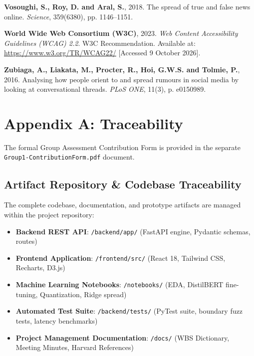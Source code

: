 \documentclass[11pt, a4paper]{article}
\newcommand{\code}[1]{\texttt{\small #1}}
\begin{document}
\begin{enumerate}[label={[\arabic*]}, leftmargin=2.5em]
  \item \label{ref:vosoughi} \textbf{Vosoughi, S., Roy, D. and Aral, S.}, 2018. The spread of true and false news online. \emph{Science}, 359(6380), pp. 1146--1151.

  \item \label{ref:w3c} \textbf{World Wide Web Consortium (W3C)}, 2023. \emph{Web Content Accessibility Guidelines (WCAG) 2.2}. W3C Recommendation. Available at: \url{https://www.w3.org/TR/WCAG22/} [Accessed 9 October 2026].

  \item \label{ref:zubiaga} \textbf{Zubiaga, A., Liakata, M., Procter, R., Hoi, G.W.S. and Tolmie, P.}, 2016. Analysing how people orient to and spread rumours in social media by looking at conversational threads. \emph{PLoS ONE}, 11(3), p. e0150989.
\end{enumerate}

\appendix
\section{Appendix A: Traceability}
\label{sec:appendix}

The formal Group Assessment Contribution Form is provided in the separate \texttt{Group1-ContributionForm.pdf} document.

\subsection{Artifact Repository \& Codebase Traceability}
The complete codebase, documentation, and prototype artifacts are managed within the project repository:
\begin{itemize}
  \item \textbf{Backend REST API}: \code{/backend/app/} (FastAPI engine, Pydantic schemas, routes)
  \item \textbf{Frontend Application}: \code{/frontend/src/} (React 18, Tailwind CSS, Recharts, D3.js)
  \item \textbf{Machine Learning Notebooks}: \code{/notebooks/} (EDA, DistilBERT fine-tuning, Quantization, Ridge spread)
  \item \textbf{Automated Test Suite}: \code{/backend/tests/} (PyTest suite, boundary fuzz tests, latency benchmarks)
  \item \textbf{Project Management Documentation}: \code{/docs/} (WBS Dictionary, Meeting Minutes, Harvard References)
\end{itemize}
\end{document}
